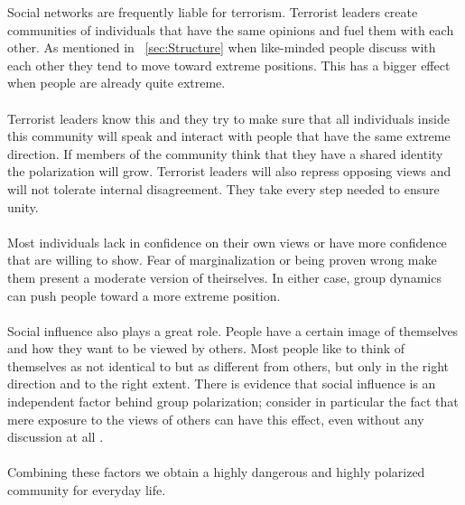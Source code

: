 Social networks are frequently liable for terrorism. Terrorist leaders create communities of individuals that have the same opinions and fuel them with each other. As mentioned in ~\ref{sec:Structure}  when like-minded people discuss with each other they tend to move toward extreme positions. This has a bigger effect when people are already quite extreme. 
\\
\\
Terrorist leaders know this and they try to make sure that all individuals inside this community will speak and interact with people that have the same extreme direction. If members of the community think that they have a shared identity the polarization will grow. Terrorist leaders will also repress opposing views and will not tolerate internal disagreement. They take every step needed to ensure unity.
\\
\\
Most individuals lack in confidence on their own views or have more confidence that are willing to show. Fear of marginalization or being proven wrong make them present a moderate version of theirselves. In either case, group dynamics can push people toward a more extreme position.
\\
\\
Social influence also plays a great role. People have a certain image of themselves and how they want to be viewed by others. Most people like to think of themselves as not identical to but as different from others, but only in the right direction and to the right extent. There is evidence that social influence is an independent factor behind group polarization; consider in particular the fact that mere exposure to the views of others can have this effect, even without any discussion at all \cite{sunstein}.
\\
\\
Combining these factors we obtain a highly dangerous and highly polarized community for everyday life.


